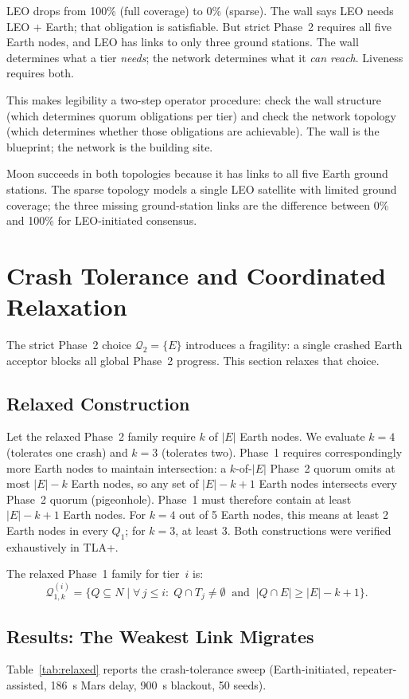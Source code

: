 \documentclass[11pt]{article}
\begin{document}
LEO drops from 100\% (full coverage) to 0\% (sparse). The wall says LEO needs LEO $+$ Earth; that obligation is satisfiable. But strict Phase~2 requires all five Earth nodes, and LEO has links to only three ground stations. The wall determines what a tier \emph{needs}; the network determines what it \emph{can reach}. Liveness requires both.

This makes legibility a two-step operator procedure: check the wall structure (which determines quorum obligations per tier) and check the network topology (which determines whether those obligations are achievable). The wall is the blueprint; the network is the building site.

Moon succeeds in both topologies because it has links to all five Earth ground stations. The sparse topology models a single LEO satellite with limited ground coverage; the three missing ground-station links are the difference between 0\% and 100\% for LEO-initiated consensus.


\section{Crash Tolerance and Coordinated Relaxation}
\label{sec:relaxed}

The strict Phase~2 choice $\mathcal{Q}_2 = \{E\}$ introduces a fragility: a single crashed Earth acceptor blocks all global Phase~2 progress. This section relaxes that choice.

\subsection{Relaxed Construction}
Let the relaxed Phase~2 family require $k$ of $|E|$ Earth nodes. We evaluate $k = 4$ (tolerates one crash) and $k = 3$ (tolerates two). Phase~1 requires correspondingly more Earth nodes to maintain intersection: a $k$-of-$|E|$ Phase~2 quorum omits at most $|E| - k$ Earth nodes, so any set of $|E| - k + 1$ Earth nodes intersects every Phase~2 quorum (pigeonhole). Phase~1 must therefore contain at least $|E| - k + 1$ Earth nodes. For $k = 4$ out of 5 Earth nodes, this means at least 2 Earth nodes in every $Q_1$; for $k = 3$, at least 3. Both constructions were verified exhaustively in TLA+.

The relaxed Phase~1 family for tier~$i$ is:
\[
\mathcal{Q}_{1,k}^{(i)} = \bigl\{Q \subseteq N \;\big|\; \forall\, j \le i:\; Q \cap T_j \neq \emptyset \;\;\text{and}\;\; |Q \cap E| \ge |E| - k + 1\bigr\}.
\]

\subsection{Results: The Weakest Link Migrates}
Table~\ref{tab:relaxed} reports the crash-tolerance sweep (Earth-initiated, repeater-assisted, 186~s Mars delay, 900~s blackout, 50 seeds).
\end{document}
